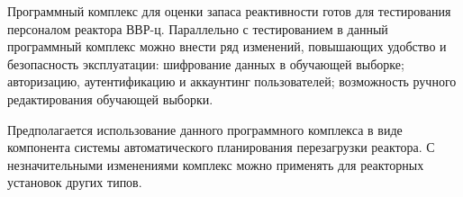 Программный комплекс для оценки запаса реактивности готов для
тестирования персоналом реактора ВВР-ц. Параллельно с тестированием в
данный программный комплекс можно внести ряд изменений, повышающих
удобство и безопасность эксплуатации: шифрование данных в обучающей
выборке; авторизацию, аутентификацию и аккаунтинг пользователей;
возможность ручного редактирования обучающей выборки.

Предполагается использование данного программного комплекса в виде
компонента системы автоматического планирования перезагрузки реактора. С
незначительными изменениями комплекс можно применять для реакторных
установок других типов.